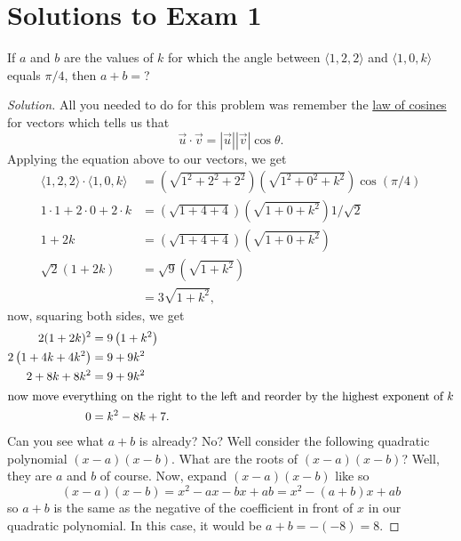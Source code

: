 \section{Solutions to Exam 1}
\begin{problem}
If $a$ and $b$ are the values of $k$ for which the angle between $\langle
1,2,2 \rangle$ and $\langle 1,0,k \rangle$ equals $\pi/4$, then $a+b=$?
\end{problem}
\begin{proof}[Solution]
All you needed to do for this problem was remember the
\href{https://en.wikipedia.org/wiki/Law_of_cosines#Vector_formulation}{law
  of cosines} for vectors which tells us that
\begin{equation}
  \label{eq:law-of-cosines}
\vec u\cdot\vec v=\left|\vec u\right|\left|\vec v\right|\cos\theta.
\end{equation}
Applying the equation above to our vectors, we get
\begingroup
\allowdisplaybreaks
\begin{align*}
\langle 1,2,2\rangle\cdot\langle 1,0,k\rangle
&=\left(\sqrt{1^2+2^2+2^2}\right)
\left(\sqrt{1^2+0^2+k^2}\right)\cos(\pi/4)\\
1\cdot 1+2\cdot 0+2\cdot k&=\left(\sqrt{1+4+4}\right)
\left(\sqrt{1+0+k^2}\right)1/\sqrt{2}\\
1+2k&=\left(\sqrt{1+4+4}\right)
\left(\sqrt{1+0+k^2}\right)\\
\sqrt{2}(1+2k)&=\sqrt{9}
\left(\sqrt{1+k^2}\right)\\
&=3\sqrt{1+k^2},
\end{align*}
\endgroup
now, squaring both sides, we get
\begingroup
\allowdisplaybreaks
\begin{align}
\label{eq:quadratic-in-k}
2(1+2k)^2&=9\left(1+k^2\right)\nonumber\\
2\left(1+4k+4k^2\right)&=9+9k^2\nonumber\\
2+8k+8k^2&=9+9k^2\nonumber\\
\intertext{now move everything on the right to the left and reorder by
  the highest exponent of $k$}
0&=k^2-8k+7.
\end{align}
\endgroup
Can you see what $a+b$ is already? No? Well consider the following
quadratic polynomial $(x-a)(x-b)$. What are the roots of $(x-a)(x-b)$?
Well, they are $a$ and $b$ of course. Now, expand $(x-a)(x-b)$ like so
\[
(x-a)(x-b)=x^2-ax-bx+ab=x^2-(a+b)x+ab
\]
so $a+b$ is the same as the negative of the coefficient in front of $x$ in
our quadratic polynomial. In this case, it would be $\boxed{a+b=-(-8)=8}$.


\end{proof}
